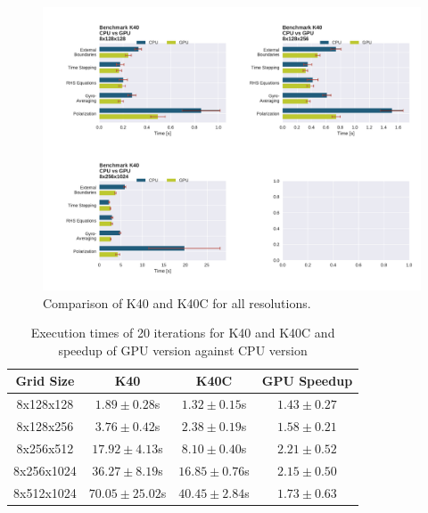\documentclass[master.tex]{subfiles}
\begin{document}
\begin{figure}[!hbtp]
    \centering
    \includegraphics[width=\linewidth]{pdfs/k40CPUvsGPU_complete_means.pdf}
    \caption{\small Comparison of \ac{K40} and \ac{K40C} for all resolutions.}
    \label{fig:k40_gpu_vs_cpu_complete_means}
\end{figure}

\begin{table}[!hbtp]
    \centering
    \begin{tabular}{c|c|c|c}
        Grid Size & \ac{K40} & \ac{K40C} & GPU Speedup  \\  \hline
        8x128x128 & $1.89 \pm 0.28$s & $1.32 \pm 0.15$s & $1.43 \pm  0.27$ \\
        8x128x256 & $3.76\pm0.42$s & $2.38\pm0.19$s & $1.58\pm0.21$ \\
        8x256x512 & $17.92\pm4.13$s & $8.10\pm0.40$s & $2.21\pm0.52$ \\
        8x256x1024 & $36.27\pm8.19$s & $16.85\pm0.76$s & $2.15\pm0.50$ \\
        8x512x1024 & $70.05\pm25.02$s & $40.45\pm2.84$s & $1.73\pm0.63$
    \end{tabular}
    \caption{Execution times of 20 iterations for \ac{K40} and \ac{K40C} and speedup of GPU version against CPU version}
    \label{tab:talbe_k40_k40c}
\end{table}
\newpage
\end{document}
